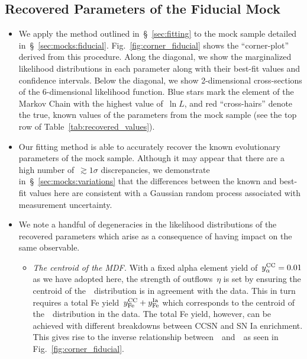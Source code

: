 \documentclass[ms.tex]{subfiles}
\begin{document}
\subsection{Recovered Parameters of the Fiducial Mock}
\label{sec:mocks:fiducial_fit}

\begin{itemize}

	\item We apply the method outlined in~\S~\ref{sec:fitting} to the
	mock sample detailed in~\S~\ref{sec:mocks:fiducial}.
	Fig.~\ref{fig:corner_fiducial} shows the ``corner-plot'' derived from this
	procedure.
	Along the diagonal, we show the marginalized likelihood distributions in
	each parameter along with their best-fit values and confidence intervals.
	Below the diagonal, we show 2-dimensional cross-sections of the
	6-dimensional likelihood function.
	Blue stars mark the element of the Markov Chain with the highest value
	of~$\ln L$, and red ``cross-hairs'' denote the true, known values of the
	parameters from the mock sample (see the top row of
	Table~\ref{tab:recovered_values}).

	\item Our fitting method is able to accurately recover the known
	evolutionary parameters of the mock sample.
	Although it may appear that there are a high number of~$\gtrsim1\sigma$
	discrepancies, we demonstrate in~\S~\ref{sec:mocks:variations} that the
	differences between the known and best-fit values here are consistent with
	a Gaussian random process associated with measurement uncertainty.

	\item We note a handful of degeneracies in the likelihood distributions of
	the recovered parameters which arise as a consequence of having impact on
	the same observable.

	\begin{itemize}

		\item \textit{The centroid of the MDF.}
		With a fixed alpha element yield of~$y_\alpha^\text{CC} = 0.01$ as we have adopted
		here, the strength of outflows~$\eta$ is set by ensuring the centroid
		of the~\ah~distribution is in agreement with the data.
		This in turn requires a total Fe yield~$y_\text{Fe}^\text{CC} + y_\text{Fe}^\text{Ia}$ which
		corresponds to the centroid of the~\feh~distribution in the data.
		The total Fe yield, however, can be achieved with different breakdowns
		between CCSN and SN Ia enrichment.
		This gives rise to the inverse relationship between~\yfecc~and~\yfeia~as
		seen in Fig.~\ref{fig:corner_fiducial}.


\end{itemize}
\end{itemize}
\end{document}
